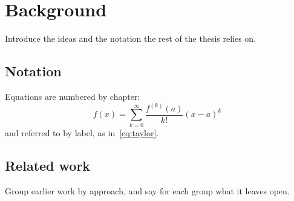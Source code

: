 \chapter{Background}
\label{ch:background}

Introduce the ideas and the notation the rest of the thesis relies on.

\section{Notation}

Equations are numbered by chapter:
\begin{equation}
  f(x) = \sum_{k=0}^{\infty} \frac{f^{(k)}(a)}{k!} (x - a)^k
  \label{eq:taylor}
\end{equation}
and referred to by label, as in~\eqref{eq:taylor}.

\section{Related work}

Group earlier work by approach, and say for each group what it leaves open.
